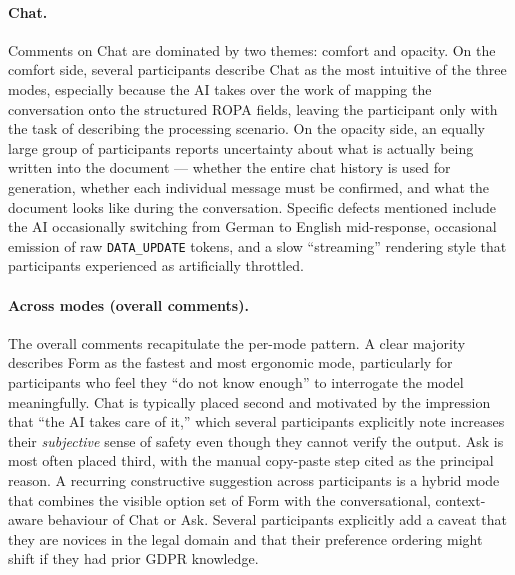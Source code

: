 \paragraph{Chat.} Comments on Chat are dominated by two themes: comfort and
opacity. On the comfort side, several participants describe Chat as the most
intuitive of the three modes, especially because the AI takes over the work
of mapping the conversation onto the structured ROPA fields, leaving the
participant only with the task of describing the processing scenario. On
the opacity side, an equally large group of participants reports
uncertainty about what is actually being written into the document — whether
the entire chat history is used for generation, whether each individual
message must be confirmed, and what the document looks like during the
conversation. Specific defects mentioned include the AI occasionally
switching from German to English mid-response, occasional emission of raw
\texttt{DATA\_UPDATE} tokens, and a slow ``streaming'' rendering style that
participants experienced as artificially throttled.

\paragraph{Across modes (overall comments).} The overall comments
recapitulate the per-mode pattern. A clear majority describes Form as the
fastest and most ergonomic mode, particularly for participants who feel they
``do not know enough'' to interrogate the model meaningfully. Chat is
typically placed second and motivated by the impression that ``the AI takes
care of it,'' which several participants explicitly note increases their
\emph{subjective} sense of safety even though they cannot verify the
output. Ask is most often placed third, with the manual copy-paste step
cited as the principal reason. A recurring constructive suggestion across
participants is a hybrid mode that combines the visible option set of Form
with the conversational, context-aware behaviour of Chat or Ask. Several
participants explicitly add a caveat that they are novices in the legal
domain and that their preference ordering might shift if they had prior
GDPR knowledge.
